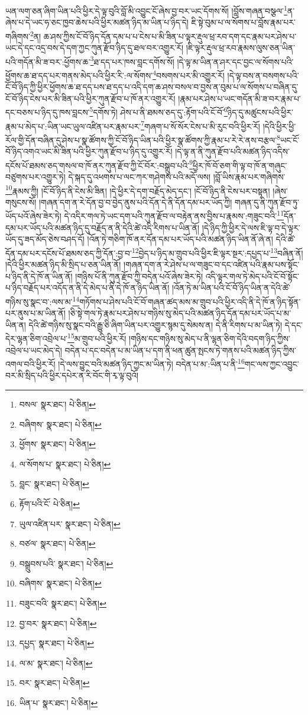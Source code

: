 ཡན་ལག་ཅན་ཞིག་ཡིན་པའི་ཕྱིར་དེ་ལྟ་བུའི་བློ་མི་འབྱུང་ངོ་ཞེས་བྱ་བར་ཡང་དོགས་སོ། །བློས་གཞན་བསྩལ་\footnote{བསལ་  སྣར་ཐང་།  པེ་ཅིན། }ན་ཞེས་པ་དེ་ཡང་ཧ་ཅང་ཁྱབ་ཆེས་པའི་ཕྱིར་མཚན་ཉིད་མ་ཡིན་པ་ཉིད་དེ། ཇི་སྟེ་བུམ་པ་ལ་སོགས་པ་བློས་རྣམ་པར་གཞིགས་\footnote{བཞིགས་  སྣར་ཐང་།  པེ་ཅིན། }ན། ཆ་ཤས་ཀྱིས་ངོ་བོ་ཉིད་དོན་དམ་པ་པ་ངེས་པ་མི་ཟིན་པ་ལྟར་རྡུལ་ཕྲ་རབ་དག་དང་རྣམ་པར་ཤེས་པ་ཡང་དེ་དང་འདྲ་བས་དེ་དག་ཀྱང་ཀུན་རྫོབ་ཉིད་དུ་ཐལ་བར་འགྱུར་རོ། །ཇི་ལྟར་རྡུལ་ཕྲ་རབ་རྣམས་ལུས་ཅན་ཡིན་པའི་གདོན་མི་ཟ་བར་:ཕྱོགས་ཆ་\footnote{ཕྱོགས་  སྣར་ཐང་།  པེ་ཅིན། }ཐ་དད་པར་ཁས་བླང་དགོས་སོ། །དེ་ལྟ་མ་ཡིན་ན་ཤར་དང་བྱང་ལ་སོགས་པའི་ཕྱོགས་ཆ་ཐ་དད་པར་གནས་མེད་པའི་ཕྱིར་རི་:ལ་སོགས་\footnote{ལ་སོགས་པ་  སྣར་ཐང་།  པེ་ཅིན། }བསགས་པར་མི་འགྱུར་རོ། །དེ་ལྟ་བས་ན་བསགས་པའི་ངོ་བོ་ཉིད་ཀྱི་ཕྱིར་ཕྱོགས་ཆ་ཐ་དད་པས་ཐ་དད་པ་འདི་དག་ཆ་ཤས་བསལ་བ་བྱས་ན་བུམ་པ་ལ་སོགས་པ་བཞིན་དུ་ངོ་བོ་ཉིད་ངེས་པར་མི་ཟིན་པའི་ཕྱིར་ཀུན་རྫོབ་པ་ཁོ་ནར་འགྱུར་རོ། །རྣམ་པར་ཤེས་པ་ཡང་གདོན་མི་ཟ་བར་རྣམ་པ་དང་བཅས་པ་ཉིད་དུ་ཁས་བླངས་\footnote{བླང་  སྣར་ཐང་།  པེ་ཅིན། }དགོས་ཏེ། ཤེས་པ་ནི་ཐམས་ཅད་དུ་:རྟོག་པའི་ངོ་བོ་\footnote{རྟོག་པའི་ངོ་  པེ་ཅིན། }ཉིད་དུ་མཚུངས་པའི་ཕྱིར་རྣམ་པ་མེད་པ་:ཡིན་ཡང་ཡུལ་འཛིན་པར་རྣམ་པར་\footnote{ཡུལ་འཛིན་པར་  སྣར་ཐང་།  པེ་ཅིན། }གཞག་པ་སོ་སོར་ངེས་པ་མི་རུང་བའི་ཕྱིར་རོ། །དེའི་ཕྱིར་ཕྱི་རོལ་གྱི་དོན་བཞིན་དུ་ཤེས་པ་སྣ་ཚོགས་ཀྱི་ངོ་བོ་ཉིད་ཡིན་པའི་ཕྱིར་སྣ་ཚོགས་ཀྱི་རྣམ་པ་རེ་རེ་ནས་བརྩལ་\footnote{བཙལ་  སྣར་ཐང་།  པེ་ཅིན། }ཡང་ངོ་བོ་ཉིད་འགའ་ཡང་མི་ཟིན་པའི་ཕྱིར་ཀུན་རྫོབ་པ་ཉིད་དུ་འགྱུར་རོ། །དེ་ལྟ་ན་ནི་ཀུན་རྫོབ་པའི་མཚན་ཉིད་འདིས་དངོས་པོ་ཐམས་ཅད་གསལ་བ་ཁོ་ནར་ཀུན་རྫོབ་ཀྱི་ངོ་བོར་:བསྒྲུབ་པའི་\footnote{བསྒྲུབས་པའི་  སྣར་ཐང་།  པེ་ཅིན། }ཕྱིར་ཁོ་བོ་ཅག་གི་ལྟ་བ་ཁོ་ན་གཞུང་བཙུགས་པར་འགྱུར་ཏེ། དེ་སྐད་དུ་འཕགས་པ་ལང་ཀར་གཤེགས་པའི་མདོ་ལས། །བློ་ཡིས་རྣམ་པར་གཞིགས་\footnote{བཞིགས་  སྣར་ཐང་།  པེ་ཅིན། }རྣམས་ཀྱི། །ངོ་བོ་ཉིད་ནི་ངེས་མི་ཟིན། །དེ་ཕྱིར་དེ་དག་བརྗོད་མེད་དང་། །ངོ་བོ་ཉིད་ནི་ངེས་པར་བསྟན། །ཞེས་གསུངས་སོ། །གཞན་དག་ན་རེ་དོན་བྱ་བ་བྱེད་ནུས་པའི་དོན་དེ་ནི་དོན་དམ་པར་ཡོད་ཀྱི། གཞན་དུ་ནི་ཀུན་རྫོབ་ཏུ་ཡོད་པའོ་ཞེས་ཟེར་ཏེ། དེ་འདིར་གལ་ཏེ་ཡང་དག་པའི་ཀུན་རྫོབ་ལ་བརྟེན་ནས་བྱིས་པ་རྣམས་:གཟུང་བའི་\footnote{བཟུང་བའི་  སྣར་ཐང་།  པེ་ཅིན། }དོན་དམ་པར་ཡོད་པའི་མཚན་ཉིད་དུ་བརྗོད་ན་ནི་དེའི་ཚེ་འདི་རིགས་པ་ཡིན་ནོ། །དེ་ཉིད་ཀྱི་ཕྱིར་དེ་ལས་ཇི་ལྟ་བ་དེ་ལྟར་ཡོད་དུ་ཟད་མོད་ཅེས་བཤད་དོ། །འོན་ཏེ་གཅིག་ཁོ་ནར་དོན་དམ་པར་ཡོད་པའི་མཚན་ཉིད་ཡིན་ནོ་ཞེ་ན། དེའི་ཚེ་དོན་དམ་པར་དངོས་པོ་ཐམས་ཅད་ཀྱི་དོན་:བྱ་བ་\footnote{བྱ་བར་  སྣར་ཐང་།  པེ་ཅིན། }བྱེད་པ་ཉིད་མ་གྲུབ་པའི་ཕྱིར་ཇི་ལྟར་སྔར་:དཔྱད་པ་\footnote{དཔྱད་  སྣར་ཐང་།  པེ་ཅིན། }བཞིན་ནོ། །དེའི་ཕྱིར་མཚན་ཉིད་མི་སྲིད་པ་ཅན་ཡིན་ནོ། །གཞན་དག་ན་རེ་ཤེས་པ་ལ་གཟུང་བ་དང་འཛིན་པའི་རྣམ་པས་སྟོང་པ་ཉིད་ནི་དེ་ཁོ་ན་ཡིན་ནོ། །གཉིས་པོ་ནི་ཀུན་རྫོབ་ཀྱི་བདེན་པའོ་ཞེས་ཟེར་ཏེ། འདི་ལྟར་གལ་ཏེ་མེད་པའི་ངོ་བོ་སྟོང་པ་ཉིད་བརྗོད་པར་འདོད་ན་ནི་དེ་མེད་པ་ནི་དེ་ཁོ་ན་ཉིད་ཡིན་ནོ། །འོན་ཏེ་མ་ཡིན་པའི་ངོ་བོ་ཉིད་ཡིན་ན་དེའི་ཚེ་གཉིས་སུ་སྣང་བ་:ལས་མ་\footnote{ལ་མ་  སྣར་ཐང་།  པེ་ཅིན། }གཏོགས་པ་ཤེས་པའི་ངོ་བོ་གཞན་ཚད་མས་མ་གྲུབ་པའི་ཕྱིར་འདི་ནི་དེ་ཁོ་ན་ཉིད་སྟོན་པར་ནུས་པ་མ་ཡིན་ནོ། །ཅི་སྟེ་གལ་ཏེ་རྣམ་པར་ཤེས་པ་གཉིས་སུ་མེད་པའི་མཚན་ཉིད་དོན་དམ་པར་ཡོད་པ་མ་ཡིན་ན། དེའི་ཚེ་གཉིས་སུ་སྣང་བའི་རྒྱུ་ཅི་ཞིག་ཡིན་པར་འགྱུར་སྙམ་དུ་སེམས་ན། དེ་ནི་རིགས་པ་མ་ཡིན་ཏེ། དེ་དང་དེར་ལྷན་ཅིག་འབྲེལ་པ་\footnote{བར་  སྣར་ཐང་།  པེ་ཅིན། }མ་གྲུབ་པའི་ཕྱིར་རོ། །གཉིས་དང་གཉིས་སུ་མེད་པ་ནི་ལྷན་ཅིག་དེའི་བདག་ཉིད་ཀྱིས་འབྲེལ་པ་ཡང་མེད་དེ། བདེན་པ་དང་བདེན་པ་མ་ཡིན་པ་དག་ནི་ཕན་ཚུན་སྤངས་ཏེ་གནས་པའི་མཚན་ཉིད་ཀྱིས་འགལ་བའི་ཕྱིར་རོ། །དེ་ལས་བྱུང་བའི་མཚན་ཉིད་ཀྱང་མ་ཡིན་ཏེ། བདེན་པ་མ་:ཡིན་པ་ནི་\footnote{ཡིན་པ་  སྣར་ཐང་།  པེ་ཅིན། }གང་ལས་ཀྱང་འབྱུང་བར་མི་སྲིད་པའི་ཕྱིར་དཔེར་ན་རི་བོང་གི་རྭ་ལྟ་བུའོ། 